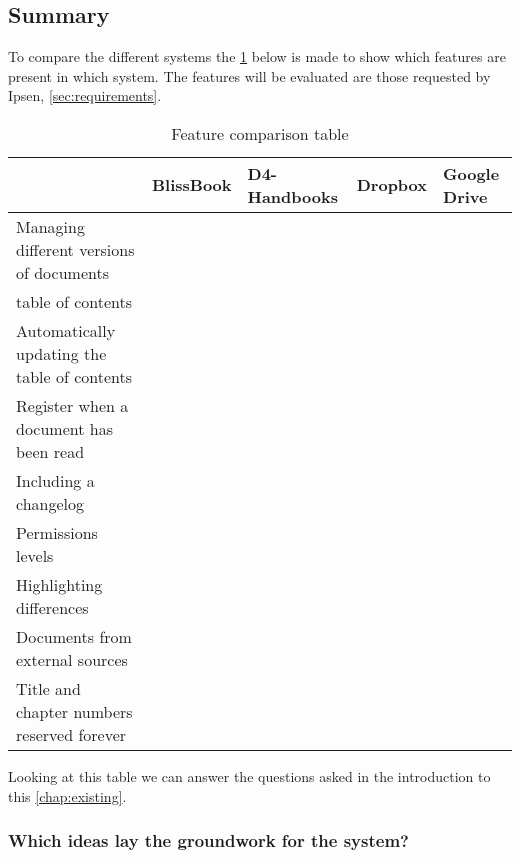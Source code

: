 \subsection{Summary}
To compare the different systems the \cref{tab:Exsisting} below is made to show which features are present in which system.
The features will be evaluated are those requested by Ipsen, \cref{sec:requirements}.

\begin{table}[H]
	\begin{center}
		\begin{tabular}{| m{5cm}|m{1.6cm}|m{2cm}|m{1.5cm}|m{1.2cm}|}
			\hline
			& BlissBook  & D4-Handbooks & Dropbox & Google \newline Drive \\
			\hline
			Managing different versions of documents & \checkmark &  &  & \checkmark \\
			\hline
			table of contents & \checkmark & \checkmark  & & \\
			\hline
			Automatically updating the table of contents & \checkmark & \checkmark  &  & \\
			\hline
			Register when a document has been read & \checkmark & \checkmark &  & \\
			\hline
			Including a changelog & \checkmark & \checkmark  &  & \\
			\hline
			Permissions levels & \checkmark &  & \checkmark & \checkmark \\
			\hline
			Highlighting differences & \checkmark &  &  & \checkmark\\
			\hline
			Documents from external \newline sources &  &  & \checkmark & \checkmark \\
			\hline
			Title and chapter numbers \newline reserved forever &  &  &  & \\
			\hline
		\end{tabular}
		\caption{Feature comparison table}\label{tab:Exsisting}
	\end{center}
\end{table}

Looking at this table we can answer the questions asked in the introduction to this \cref{chap:existing}.

\subsubsection*{Which ideas lay the groundwork for the system?}

